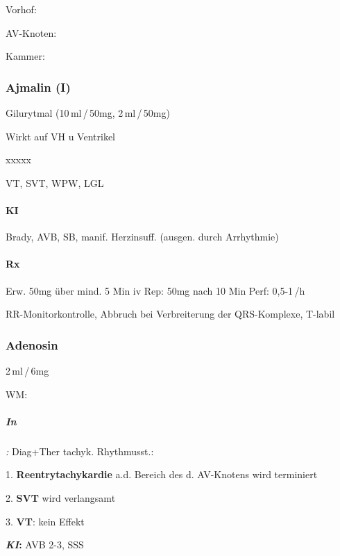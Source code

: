 Vorhof: 

AV-Knoten:

Kammer: 


%

\subsubsection{Ajmalin (I)} 

Gilurytmal (10\,ml\,/\,50mg, 2\,ml\,/\,50mg)

Wirkt auf VH u Ventrikel

\begin{labeling}[~]{xxxxx}\item[I:] \item[KI]\end{labeling} VT, SVT, WPW, LGL

\paragraph{KI} Brady, AVB, SB, manif. Herzinsuff. (ausgen. durch Arrhythmie)

{\color[rgb]{0.5019608,0.0,0.5019608}
\paragraph{Rx} Erw. 50mg über mind. 5 Min iv\newline
Rep: 50mg nach 10 Min\newline
Perf: 0,5-1\,/h}

RR-Monitorkontrolle, Abbruch bei Verbreiterung der QRS-Komplexe,
T{\textdegree}-labil


\subsubsection{Adenosin}

2\,ml\,/\,6mg


WM: 

\subparagraph{In}\textit{: }Diag+Ther tachyk. Rhythmusst.: 

{\color[rgb]{0.0,0.5019608,0.0}
1. \textbf{Reentrytachykardie} a.d. Bereich des d. AV-Knotens wird
terminiert}

{\color[rgb]{0.0,0.5019608,0.0}
2. \textbf{SVT} wird verlangsamt}

{\color[rgb]{0.0,0.5019608,0.0}
3. \textbf{VT}: kein Effekt}

{\color[rgb]{0.8627451,0.13725491,0.0}
\textbf{\textit{KI}}\textbf{: }AVB 2-3{\textdegree}, SSS}


